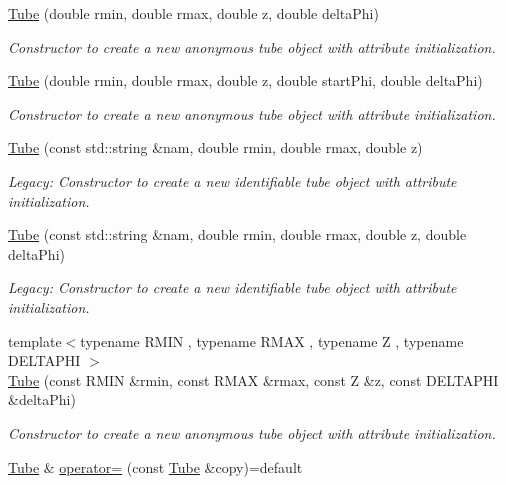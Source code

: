 \begin{DoxyCompactItemize}
\hyperlink{class_d_d4hep_1_1_geometry_1_1_tube_a27440d0dd4318c664ff4f3c4a36dd4f0}{Tube} (double rmin, double rmax, double z, double delta\+Phi)
\begin{DoxyCompactList}\small\item\em Constructor to create a new anonymous tube object with attribute initialization. \end{DoxyCompactList}\item 
\hyperlink{class_d_d4hep_1_1_geometry_1_1_tube_a438240ff1fcab0e3e737c57d0e042fc6}{Tube} (double rmin, double rmax, double z, double start\+Phi, double delta\+Phi)
\begin{DoxyCompactList}\small\item\em Constructor to create a new anonymous tube object with attribute initialization. \end{DoxyCompactList}\item 
\hyperlink{class_d_d4hep_1_1_geometry_1_1_tube_ae031124eb6636f34a07965ca7615c7fa}{Tube} (const std\+::string \&nam, double rmin, double rmax, double z)
\begin{DoxyCompactList}\small\item\em Legacy\+: Constructor to create a new identifiable tube object with attribute initialization. \end{DoxyCompactList}\item 
\hyperlink{class_d_d4hep_1_1_geometry_1_1_tube_a30ea96e53731054bcad134f3734aa958}{Tube} (const std\+::string \&nam, double rmin, double rmax, double z, double delta\+Phi)
\begin{DoxyCompactList}\small\item\em Legacy\+: Constructor to create a new identifiable tube object with attribute initialization. \end{DoxyCompactList}\item 
{\footnotesize template$<$typename R\+M\+IN , typename R\+M\+AX , typename Z , typename D\+E\+L\+T\+A\+P\+HI $>$ }\\\hyperlink{class_d_d4hep_1_1_geometry_1_1_tube_a44a3b5299c2945bf0dd6aecdeaf7499c}{Tube} (const R\+M\+IN \&rmin, const R\+M\+AX \&rmax, const Z \&z, const D\+E\+L\+T\+A\+P\+HI \&delta\+Phi)
\begin{DoxyCompactList}\small\item\em Constructor to create a new anonymous tube object with attribute initialization. \end{DoxyCompactList}\item 
\hyperlink{class_d_d4hep_1_1_geometry_1_1_tube}{Tube} \& \hyperlink{class_d_d4hep_1_1_geometry_1_1_tube_a290f92c3bb4585c77e775460412fea42}{operator=} (const \hyperlink{class_d_d4hep_1_1_geometry_1_1_tube}{Tube} \&copy)=default

\end{DoxyCompactItemize}
